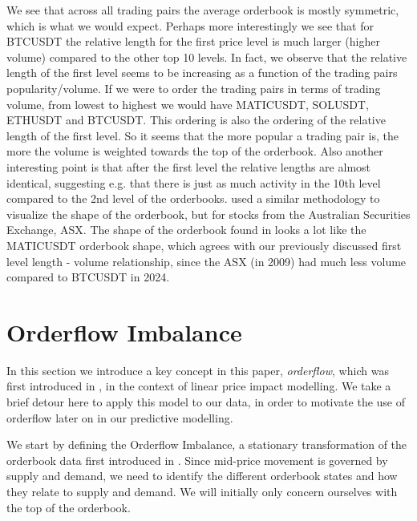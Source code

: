 We see that across all trading pairs the average orderbook is mostly symmetric,
which is what we would expect. Perhaps more interestingly we see that for BTCUSDT the relative
length for the first price level is much larger (higher volume) compared to the other top 10 levels.
In fact, we observe that the relative length of the first level seems to be increasing as a function
of the trading pairs popularity/volume. If we were to order the trading pairs in terms of trading volume, from 
lowest to highest we would have MATICUSDT, SOLUSDT, ETHUSDT and BTCUSDT. This ordering
is also the ordering of the relative length of the first level. So it seems that
the more popular a trading pair is, the more the volume is weighted towards the top of
the orderbook. Also another interesting point is that after the first level
the relative lengths are almost identical, suggesting e.g. that there is just as much
activity in the 10th level compared to the 2nd level of the orderbooks.
\cite{CAO2009} used a similar methodology to visualize the shape of the orderbook,
but for stocks from the Australian Securities Exchange, ASX. The shape of the orderbook
found in \cite{CAO2009} looks a lot like the MATICUSDT orderbook shape, which
agrees with our previously discussed first level length - volume relationship, since the ASX
(in 2009) had much less volume compared to BTCUSDT in 2024.

\section{Orderflow Imbalance}
In this section we introduce a key concept in this paper, \textit{orderflow}, which was first introduced in
\cite{CONT2013}, in the context of linear price impact modelling. We take a brief detour
here to apply this model to our data, in order to motivate the use of orderflow later on in our predictive modelling.

We start by defining the Orderflow Imbalance, a stationary transformation of the orderbook data
first introduced in \cite{CONT2013}.
Since mid-price movement is governed by supply and demand, we need to identify
the different orderbook states and how they relate to supply and demand.
We will initially only concern ourselves with the top of the orderbook.


